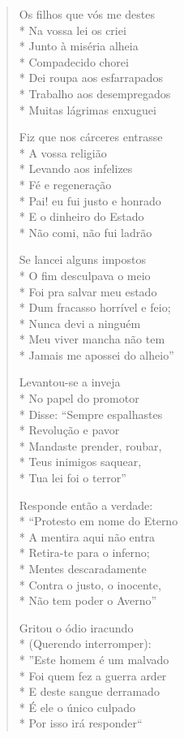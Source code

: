 \begin{verse}
Os filhos que vós me destes\\*
Na vossa lei os criei\\*
Junto à miséria alheia\\*
Compadecido chorei\\*
Dei roupa aos esfarrapados\\*
Trabalho aos desempregados\\*
Muitas lágrimas enxuguei

Fiz que nos cárceres entrasse\\*
A vossa religião\\*
Levando aos infelizes\\*
Fé e regeneração\\*
Pai! eu fui justo e honrado\\*
E o dinheiro do Estado\\*
Não comi, não fui ladrão

Se lancei alguns impostos\\*
O fim desculpava o meio\\*
Foi pra salvar meu estado\\*
Dum fracasso horrível e feio;\\*
Nunca devi a ninguém\\*
Meu viver mancha não tem\\*
Jamais me apossei do alheio''

Levantou-se a inveja\\*
No papel do promotor\\*
Disse: ``Sempre espalhastes\\*
Revolução e pavor\\*
Mandaste prender, roubar,\\*
Teus inimigos saquear,\\*
Tua lei foi o terror''

Responde então a verdade:\\*
``Protesto em nome do Eterno\\*
A mentira aqui não entra\\*
Retira-te para o inferno;\\*
Mentes descaradamente\\*
Contra o justo, o inocente,\\*
Não tem poder o Averno''

Gritou o ódio iracundo\\*
(Querendo interromper):\\*
''Este homem é um malvado\\*
Foi quem fez a guerra arder\\*
E deste sangue derramado\\*
É ele o único culpado\\*
Por isso irá responder``


\end{verse}
